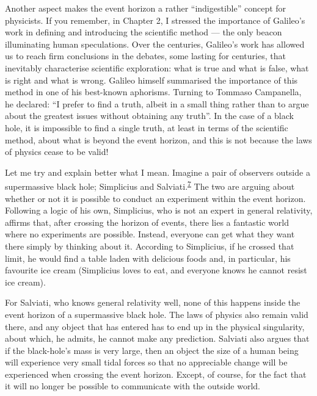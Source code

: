 Another aspect makes the event horizon a rather ``indigestible'' concept for physicists.
If you remember, in Chapter 2, I stressed the importance of Galileo's work in defining
and introducing the scientific method --- the only beacon illuminating
human speculations. Over the centuries, Galileo's work has allowed us to reach firm
conclusions in the debates, some lasting for centuries, that inevitably characterise
scientific exploration: what is true and what is false, what is right and what is wrong.
Galileo himself summarised the importance of this method in one of his best-known
aphorisms. Turning to Tommaso Campanella, he declared: ``I prefer to find a truth,
albeit in a small thing rather than to argue about the greatest issues without obtaining
any truth''. In the case of a black hole, it is impossible to find a single truth, at
least in terms of the scientific method, about what is beyond the event horizon, and
this is not because the laws of physics cease to be valid!

Let me try and explain better what I mean. Imagine a pair of observers outside a
supermassive black hole; Simplicius and
Salviati.\textsuperscript{\hyperlink{note:06-07}{7}} The two are arguing about whether or not
it is possible to conduct an experiment within the event horizon.
Following a logic of his own, Simplicius, who is not an expert in general relativity,
affirms that, after crossing the horizon of events, there lies a fantastic world where
no experiments are possible. Instead, everyone can get what they want there simply by
thinking about it. According to Simplicius, if he crossed that limit, he would find a
table laden with delicious foods and, in particular, his favourite ice cream (Simplicius
loves to eat, and everyone knows he cannot resist ice cream).

For Salviati, who knows general relativity well, none of this happens
inside the event horizon of a supermassive black hole. The laws of physics also remain
valid there, and any object that has entered has to end up in the physical
singularity, about which, he admits, he cannot make any prediction.
Salviati also argues that if the black-hole's mass is very large, then an object the
size of a human being will experience very small tidal forces so that
no appreciable change will be experienced when crossing the event horizon. Except, of
course, for the fact that it will no longer be possible to communicate with the outside
world.


